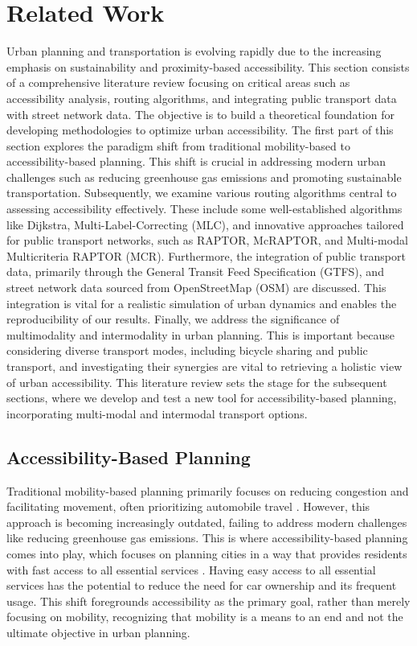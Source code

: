 \clearpage
\section{Related Work}
\label{sec:related_work}

Urban planning and transportation is evolving rapidly due to the increasing emphasis on sustainability and proximity-based accessibility. 
This section consists of a comprehensive literature review focusing on critical areas such as accessibility analysis, routing algorithms, and integrating public transport data with street network data. 
The objective is to build a theoretical foundation for developing methodologies to optimize urban accessibility. 
The first part of this section explores the paradigm shift from traditional mobility-based to accessibility-based planning.
This shift is crucial in addressing modern urban challenges such as reducing greenhouse gas emissions and promoting sustainable transportation. 
Subsequently, we examine various routing algorithms central to assessing accessibility effectively. 
These include some well-established algorithms like Dijkstra, Multi-Label-Correcting (MLC), and innovative approaches tailored for public transport networks, such as RAPTOR, McRAPTOR, and Multi-modal Multicriteria RAPTOR (MCR). 
Furthermore, the integration of public transport data, primarily through the General Transit Feed Specification (GTFS), and street network data sourced from OpenStreetMap (OSM) are discussed. 
This integration is vital for a realistic simulation of urban dynamics and enables the reproducibility of our results. 
Finally, we address the significance of multimodality and intermodality in urban planning.
This is important because considering diverse transport modes, including bicycle sharing and public transport, and investigating their synergies are vital to retrieving a holistic view of urban accessibility.
This literature review sets the stage for the subsequent sections, where we develop and test a new tool for accessibility-based planning, incorporating multi-modal and intermodal transport options.

\subsection{Accessibility-Based Planning}
\label{subsec:accessibility_based_planning}

Traditional mobility-based planning primarily focuses on reducing congestion and facilitating movement, often prioritizing automobile travel .
However, this approach is becoming increasingly outdated, failing to address modern challenges like reducing greenhouse gas emissions.
This is where accessibility-based planning comes into play, which focuses on planning cities in a way that provides residents with fast access to all essential services .
Having easy access to all essential services has the potential to reduce the need for car ownership and its frequent usage.
This shift foregrounds accessibility as the primary goal, rather than merely focusing on mobility, recognizing that mobility is a means to an end and not the ultimate objective in urban planning. 

